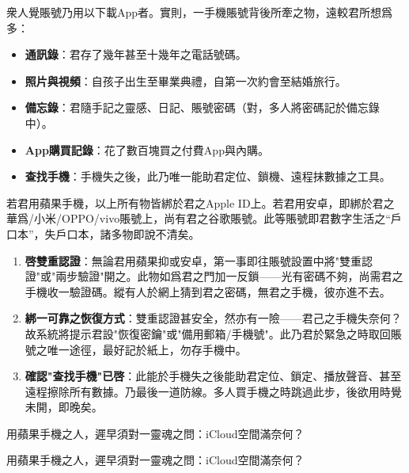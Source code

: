 


衆人覺賬號乃用以下載App者。實則，一手機賬號背後所牽之物，遠較君所想爲多：

\begin{itemize}
  \item \textbf{通訊錄}：君存了幾年甚至十幾年之電話號碼。
  \item \textbf{照片與視頻}：自孩子出生至畢業典禮，自第一次約會至結婚旅行。
  \item \textbf{備忘錄}：君隨手記之靈感、日記、賬號密碼（對，多人將密碼記於備忘錄中）。
  \item \textbf{App購買記錄}：花了數百塊買之付費App與內購。
  \item \textbf{查找手機}：手機失之後，此乃唯一能助君定位、鎖機、遠程抹數據之工具。
\end{itemize}

若君用蘋果手機，以上所有物皆綁於君之Apple ID上。若君用安卓，即綁於君之華爲/小米/OPPO/vivo賬號上，尚有君之谷歌賬號。此等賬號即君數字生活之“戶口本”，失戶口本，諸多物即說不清矣。


\begin{enumerate}
  \item \textbf{啓雙重認證}：無論君用蘋果抑或安卓，第一事即往賬號設置中將"雙重認證"或"兩步驗證"開之。此物如爲君之門加一反鎖——光有密碼不夠，尚需君之手機收一驗證碼。縱有人於網上猜到君之密碼，無君之手機，彼亦進不去。
  \item \textbf{綁一可靠之恢復方式}：雙重認證甚安全，然亦有一險——君己之手機失奈何？故系統將提示君設"恢復密鑰"或"備用郵箱/手機號"。此乃君於緊急之時取回賬號之唯一途徑，最好記於紙上，勿存手機中。
  \item \textbf{確認"查找手機"已啓}：此能於手機失之後能助君定位、鎖定、播放聲音、甚至遠程擦除所有數據。乃最後一道防線。多人買手機之時跳過此步，後欲用時覺未開，即晚矣。
\end{enumerate}


用蘋果手機之人，遲早須對一靈魂之問：iCloud空間滿奈何？

用蘋果手機之人，遲早須對一靈魂之問：iCloud空間滿奈何？


